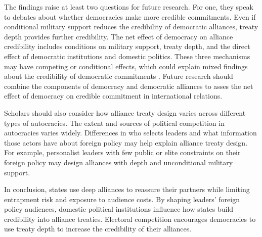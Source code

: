 \documentclass[12pt]{article}
\begin{document}
The findings raise at least two questions for future research.  
For one, they speak to debates about whether democracies make more credible commitments. 
Even if conditional military support reduces the credibility of democratic alliances, treaty depth provides further credibility. 
The net effect of democracy on alliance credibility includes conditions on military support, treaty depth, and the direct effect of democratic institutions and domestic politics. 
These three mechanisms may have competing or conditional effects, which could explain mixed findings about the credibility of democratic commitments \citep{Schultz1999, Leeds1999, Thyne2012, DownesSechser2012, PotterBaum2014}.
Future research should combine the components of democracy and democratic alliances to asses the net effect of democracy on credible commitment in international relations. 


Scholars should also consider how alliance treaty design varies across different types of autocracies. 
The extent and sources of political competition in autocracies varies widely. 
Differences in who selects leaders and what information those actors have about foreign policy \citep{Weeks2008} may help explain alliance treaty design.
For example, personalist leaders with few public or elite constraints on their foreign policy may design alliances with depth and unconditional military support. 


In conclusion, states use deep alliances to reassure their partners while limiting entrapment risk and exposure to audience costs. 
By shaping leaders' foreign policy audiences, domestic political institutions influence how states build credibility into alliance treaties.
Electoral competition encourages democracies to use treaty depth to increase the credibility of their alliances. 



 
 
\end{document}
